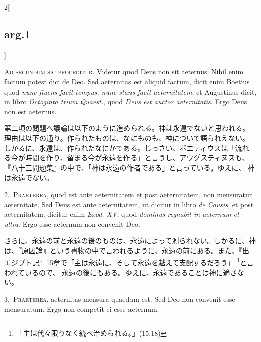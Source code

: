 \documentclass[paper=a4paper,fontsize=10pt,jafontsize=9pt,titlepage]{jlreq}
\begin{document}
\begin{paracol}{2}[\subsection{arg.1}]

{\huge A}{\scshape d secundum sic proceditur}. Videtur quod Deus non sit aeternus. Nihil
enim factum potest dici de Deo. Sed aeternitas est aliquid factum, dicit
enim Boetius quod {\itshape nunc fluens facit tempus, nunc stans facit
aeternitatem}; et Augustinus dicit, in libro {\itshape Octoginta trium Quaest.},
quod {\itshape Deus est auctor aeternitatis}. Ergo Deus non est
 aeternus.

\switchcolumn

第二項の問題へ議論は以下のように進められる。神は永遠でないと思われる。
理由は以下の通り。作られたものは、なにものも、神について語られえない。
しかるに、永遠は、作られたなにかである。じっさい、ボエティウスは「流れ
る今が時間を作り、留まる今が永遠を作る」と言うし、アウグスティヌスも、
『八十三問題集』の中で、「神は永遠の作者である」と言っている。ゆえに、
神は永遠でない。


2.~{\scshape Praeterea}, quod est ante aeternitatem et post aeternitatem, non
mensuratur aeternitate. Sed Deus est ante aeternitatem, ut dicitur in
libro {\itshape de Causis}, et post aeternitatem; dicitur enim {\itshape Exod. XV}, quod
{\itshape dominus regnabit in aeternum et ultra}. Ergo esse aeternum non convenit
Deo.

\switchcolumn

さらに、永遠の前と永遠の後のものは、永遠によって測られない。しかるに、神
は、『原因論』という書物の中で言われるように、永遠の前にある。また、『出
エジプト記』15章で「主は永遠に、そして永遠を越えて支配するだろう」
\footnote{「主は代々限りなく統べ治められる。」(15:18)}と言われているので、
永遠の後にもある。ゆえに、永遠であることは神に適さない。


3.~{\scshape Praeterea}, aeternitas mensura quaedam est. Sed Deo non
convenit esse mensuratum. Ergo non competit ei esse aeternum.


\end{paracol}
\end{document}
